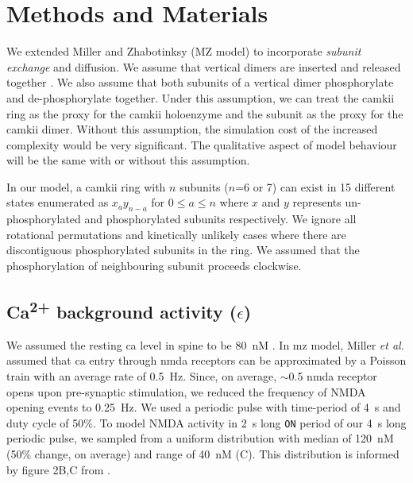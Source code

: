 \documentclass[9pt,lineno,doublespacing]{elife}
\newcommand\SUP[2]{#1\textsuperscript{#2}}
\begin{document}
\section{Methods and Materials}{\label{sec:materials_and_methods} 

We extended Miller and Zhabotinksy (MZ model) \citep{miller_stability_2005} to
incorporate \emph{subunit exchange} and diffusion. We assume that vertical
dimers are inserted and released together \citep{bhattacharyya_molecular_2016}.
We also assume that both subunits of a vertical dimer phosphorylate and
de-phosphorylate together. Under this assumption, we can treat the \gls{camkii}
ring as the proxy for the \gls{camkii} holoenzyme and the subunit as the proxy
for the \gls{camkii} dimer. Without this assumption, the simulation cost of the
increased complexity would be very significant. The qualitative aspect of model
behaviour will be the same with or without this assumption. 

In our model, a \gls{camkii} ring with $n$ subunits ($n$=6 or 7) can exist
in 15 different states enumerated as $x_{a}y_{n-a}$ for $0 \le a \le n$ where
$x$ and $y$ represents un-phosphorylated and phosphorylated subunits
respectively. We ignore all rotational permutations and kinetically unlikely
cases where there are discontiguous phosphorylated subunits in the ring. We
assumed that the phosphorylation of neighbouring subunit proceeds clockwise.

\subsection{\SUP{Ca}{2+} background activity ($\epsilon$)}\label{subsec:calcium_background}

We assumed the resting \gls{ca} level in spine to be \SI{80}{\nano M}
\citep{berridge_neuronal_1998}. In \gls{mz} model, Miller \textit{et al.}
assumed that \gls{ca} entry through \gls{nmda} receptors can be approximated by
a Poisson train with an average rate of \SI{0.5}{Hz}. Since, on average,
$\sim$0.5 \gls{nmda} receptor opens \citep{nimchinsky_number_2004} upon
pre-synaptic stimulation, we reduced the frequency of NMDA opening events to
\SI{0.25}{Hz}. We used a periodic pulse with time-period of \SI{4}{\second} and
duty cycle of 50\%. To model NMDA activity in \SI{2}{\second} long \texttt{ON}
period of our \SI{4}{\second} long periodic pulse, we sampled from a uniform
distribution with median of \SI{120}{\nano M} (50\% change, on average) and
range of \SI{40}{\nano M} (C). This distribution is informed by
figure 2B,C from \citep{nimchinsky_number_2004}.

}
\end{document}

